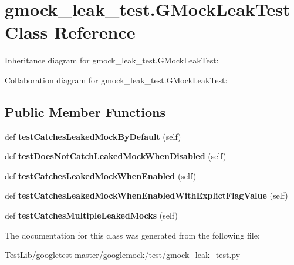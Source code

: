 \hypertarget{classgmock__leak__test_1_1GMockLeakTest}{}\section{gmock\+\_\+leak\+\_\+test.\+G\+Mock\+Leak\+Test Class Reference}
\label{classgmock__leak__test_1_1GMockLeakTest}


Inheritance diagram for gmock\+\_\+leak\+\_\+test.\+G\+Mock\+Leak\+Test\+:


Collaboration diagram for gmock\+\_\+leak\+\_\+test.\+G\+Mock\+Leak\+Test\+:
\subsection*{Public Member Functions}
\begin{DoxyCompactItemize}
\item 
\mbox{\label{classgmock__leak__test_1_1GMockLeakTest_ad87d271de7b3f106e51272d6e9139c76}} 
def {\bfseries test\+Catches\+Leaked\+Mock\+By\+Default} (self)
\item 
\mbox{\label{classgmock__leak__test_1_1GMockLeakTest_a3107bf5a603558ab2d97d88fb5589951}} 
def {\bfseries test\+Does\+Not\+Catch\+Leaked\+Mock\+When\+Disabled} (self)
\item 
\mbox{\label{classgmock__leak__test_1_1GMockLeakTest_a78f4040a392d183597f71d92da8c1246}} 
def {\bfseries test\+Catches\+Leaked\+Mock\+When\+Enabled} (self)
\item 
\mbox{\label{classgmock__leak__test_1_1GMockLeakTest_ab19cf302ea06e1b186bd6ab951d9161e}} 
def {\bfseries test\+Catches\+Leaked\+Mock\+When\+Enabled\+With\+Explict\+Flag\+Value} (self)
\item 
\mbox{\label{classgmock__leak__test_1_1GMockLeakTest_a09465b2bfde98834e4bb9563c035f034}} 
def {\bfseries test\+Catches\+Multiple\+Leaked\+Mocks} (self)
\end{DoxyCompactItemize}


The documentation for this class was generated from the following file\+:\begin{DoxyCompactItemize}
\item 
Test\+Lib/googletest-\/master/googlemock/test/gmock\+\_\+leak\+\_\+test.\+py\end{DoxyCompactItemize}
